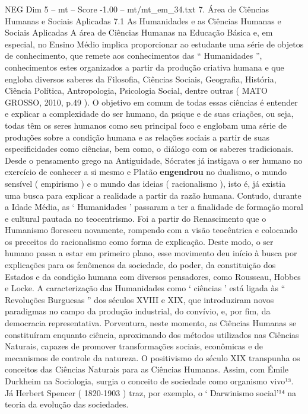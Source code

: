 \begin{textsample}{NEG Dim 5 – mt – Score -1.00 – mt/mt\_em\_34.txt}  \label{ex:f5_neg_204}
7.
Área de Ciências Humanas e Sociais Aplicadas 7.1 As Humanidades e as Ciências Humanas e Sociais Aplicadas A área de Ciências Humanas na Educação Básica e, em especial, no Ensino Médio implica proporcionar ao estudante uma série de objetos de conhecimento, que remete aos conhecimentos das “ Humanidades ”, conhecimentos estes organizados a partir da produção criativa humana e que engloba diversos saberes da Filosofia, Ciências Sociais, Geografia, História, Ciência Política, Antropologia, Psicologia Social, dentre outras ( MATO GROSSO, 2010, p.49 ).
O objetivo em comum de todas essas ciências é entender e explicar a complexidade do ser humano, da psique e de suas criações, ou seja, todas têm os seres humanos como seu principal foco e englobam uma série de produções sobre a condição humana e as relações sociais a partir de suas especificidades como ciências, bem como, o diálogo com os saberes tradicionais.
Desde o pensamento grego na Antiguidade, Sócrates já instigava o ser humano no exercício de conhecer a si mesmo e Platão \textbf{engendrou} no dualismo, o mundo sensível ( empirismo ) e o mundo das ideias ( racionalismo ), isto é, já existia uma busca para explicar a realidade a partir da razão humana.
Contudo, durante a Idade Média, as ‘ Humanidades ’ passaram a ter a finalidade de formação moral e cultural pautada no teocentrismo.
Foi a partir do Renascimento que o Humanismo floresceu novamente, rompendo com a visão teocêntrica e colocando os preceitos do racionalismo como forma de explicação.
Deste modo, o ser humano passa a estar em primeiro plano, esse movimento deu início à busca por explicações para os fenômenos da sociedade, do poder, da constituição dos Estados e da condição humana com diversos pensadores, como Rousseau, Hobbes e Locke.
A caracterização das Humanidades como ‘ ciências ’ está ligada às “ Revoluções Burguesas ” dos séculos XVIII e XIX, que introduziram novos paradigmas no campo da produção industrial, do convívio, e, por fim, da democracia representativa.
Porventura, neste momento, as Ciências Humanas se constituíram enquanto ciência, aproximando dos métodos utilizados nas Ciências Naturais, capazes de promover transformações sociais, econômicas e de mecanismos de controle da natureza.
O positivismo do século XIX transpunha os conceitos das Ciências Naturais para as Ciências Humanas.
Assim, com Émile Durkheim na Sociologia, surgia o conceito de sociedade como organismo vivo¹³.
Já Herbert Spencer ( 1820-1903 ) traz, por exemplo, o ‘ Darwinismo social’¹⁴ na teoria da evolução das sociedades.

\end{textsample}
